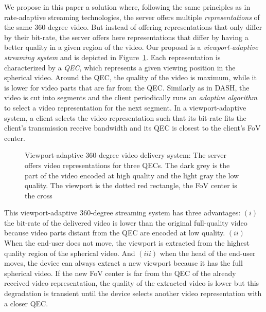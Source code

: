 We propose in this paper a solution where, following the same
principles as in rate-adaptive streaming technologies, the server
offers multiple \emph{representations} of the same 360-degree video.
But instead of offering representations that only differ by their
bit-rate, the server offers here representations that differ by having
a better quality in a given region of the video. Our proposal is a
\emph{viewport-adaptive streaming system} and is depicted in
Figure~\ref{fig:deliverychain}. Each representation is characterized
by a \emph{\ac{QEC}}, which represents a given viewing position in the
spherical video. Around the \ac{QEC}, the quality of the video is
maximum, while it is lower for video parts that are far from the
\ac{QEC}. Similarly as in \ac{DASH}, the video is cut into segments
and the client periodically runs an \emph{adaptive algorithm} to
select a video representation for the next segment. In a
viewport-adaptive system, a client selects the video representation
such that its bit-rate fits the client's transmission receive
bandwidth and its \ac{QEC} is closest to the client's \ac{FoV} center.

\begin{figure}[h]

   \centering
   
   \caption{Viewport-adaptive 360-degree video delivery system: The server
   offers video representations for three \acp{QEC}. The dark grey is the part of the video encoded at high quality and the light
   gray the low quality. The viewport is the dotted red rectangle, the \ac{FoV} center is the
   cross}
   \label{fig:deliverychain}
\end{figure}

This viewport-adaptive 360-degree streaming system has three
advantages: $(i)$ the bit-rate of the delivered video is lower than
the original full-quality video because video parts distant from the
\ac{QEC} are encoded at low quality. $(ii)$ When the end-user does not
move, the viewport is extracted from the highest quality region of the
spherical video. And $(iii)$ when the head of the end-user moves, the
device can always extract a new viewport because it has the full
spherical video. If the new \ac{FoV} center is far from the \ac{QEC}
of the already received video representation, the quality of the
extracted video is lower but this degradation is transient until the
device selects another video representation with a closer \ac{QEC}.


